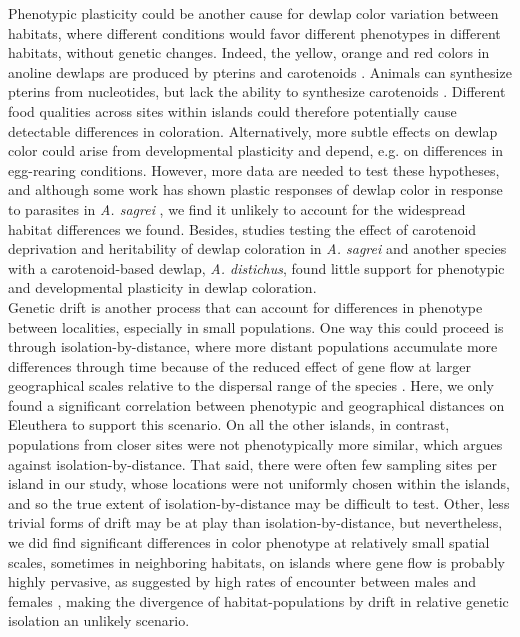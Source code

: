 Phenotypic plasticity could be another cause for dewlap color variation between habitats, where different conditions would favor different phenotypes in different habitats, without genetic changes. Indeed, the yellow, orange and red colors in anoline dewlaps are produced by pterins and carotenoids \citep{Ortiz1962, Ortiz1962a, Ortiz1963, Ortiz1966, Macedonia2000, Steffen2007, Steffen2009}. Animals can synthesize pterins from nucleotides, but lack the ability to synthesize carotenoids \citep{Goodwin1984, Hill2002, Hill2006}. Different food qualities across sites within islands could therefore potentially cause detectable differences in coloration. Alternatively, more subtle effects on dewlap color could arise from developmental plasticity and depend, e.g. on differences in egg-rearing conditions. However, more data are needed to test these hypotheses, and although some work has shown plastic responses of dewlap color in response to parasites in \textit{A. sagrei} \citep{Cook2013}, we find it unlikely to account for the widespread habitat differences we found. Besides, studies testing the effect of carotenoid deprivation \citep{Steffen2010, Ng2013} and heritability \citep{Cox2017} of dewlap coloration in \textit{A. sagrei} and another species with a carotenoid-based dewlap, \textit{A. distichus}, found little support for phenotypic and developmental plasticity in dewlap coloration.\\

Genetic drift is another process that can account for differences in phenotype between localities, especially in small populations. One way this could proceed is through isolation-by-distance, where more distant populations accumulate more differences through time because of the reduced effect of gene flow at larger geographical scales relative to the dispersal range of the species \citep{Rousset2004}. Here, we only found a significant correlation between phenotypic and geographical distances on Eleuthera to support this scenario. On all the other islands, in contrast, populations from closer sites were not phenotypically more similar, which argues against isolation-by-distance. That said, there were often few sampling sites per island in our study, whose locations were not uniformly chosen within the islands, and so the true extent of isolation-by-distance may be difficult to test. Other, less trivial forms of drift may be at play than isolation-by-distance, but nevertheless, we did find significant differences in color phenotype at relatively small spatial scales, sometimes in neighboring habitats, on islands where gene flow is probably highly pervasive, as suggested by high rates of encounter between males and females \citep{Kamath2018}, making the divergence of habitat-populations by drift in relative genetic isolation an unlikely scenario.\\

